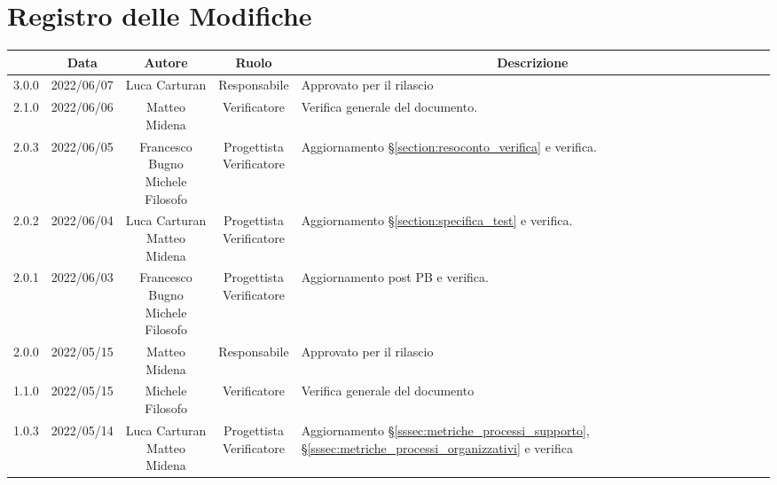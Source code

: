 \thispagestyle{empty}
\section*{Registro delle Modifiche}

\begin{center}
	\renewcommand{\arraystretch}{1.8}
	\begin{longtable}[c]{c | c | c | c | p{5cm}}
		\rowcolor[HTML]{125E28}
		\multicolumn{1}{c}{\color[HTML]{FFFFFF} \textbf{Versione}} & 
		\multicolumn{1}{c}{\color[HTML]{FFFFFF} \textbf{Data}} & 
		\multicolumn{1}{c}{\color[HTML]{FFFFFF} \textbf{Autore}} & 
		\multicolumn{1}{c}{\color[HTML]{FFFFFF} \textbf{Ruolo}} & 
		\multicolumn{1}{c}{\color[HTML]{FFFFFF} \textbf{Descrizione}} \\
		\endhead
		3.0.0 & 2022/06/07 & Luca Carturan & Responsabile & Approvato per il rilascio\\
		2.1.0 & 2022/06/06 & Matteo Midena & Verificatore & Verifica generale del documento.\\
		2.0.3 & 2022/06/05 & \Longunderstack{Francesco Bugno \\ Michele Filosofo} & \Longunderstack{Progettista \\ Verificatore} & Aggiornamento §\ref{section:resoconto_verifica} e verifica.\\
		2.0.2 & 2022/06/04 & \Longunderstack{Luca Carturan \\ Matteo Midena} & \Longunderstack{Progettista \\ Verificatore} & Aggiornamento §\ref{section:specifica_test} e verifica.\\
		2.0.1 & 2022/06/03 & \Longunderstack{Francesco Bugno\\Michele Filosofo} & \Longunderstack{Progettista \\ Verificatore} & Aggiornamento post PB e verifica.\\
		2.0.0 & 2022/05/15 & Matteo Midena & Responsabile & Approvato per il rilascio\\
		1.1.0 & 2022/05/15 & Michele Filosofo & Verificatore & Verifica generale del documento\\
		1.0.3 & 2022/05/14 & \Longunderstack{Luca Carturan\\Matteo Midena} & \Longunderstack{Progettista\\Verificatore} & Aggiornamento §\ref{sssec:metriche_processi_supporto}, §\ref{sssec:metriche_processi_organizzativi} e verifica\\

\end{longtable}
\end{center}

